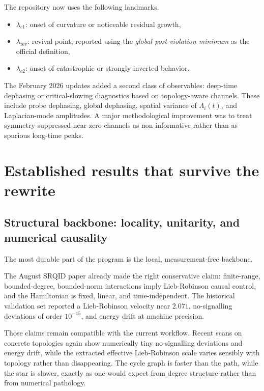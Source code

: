 \documentclass[11pt]{article}
\begin{document}
The repository now uses the following landmarks.

\begin{itemize}
    \item $\lambda_{c1}$: onset of curvature or noticeable residual growth,
    \item $\lambda_{\mathrm{rev}}$: revival point, reported using the \emph{global post-violation minimum} as the official definition,
    \item $\lambda_{c2}$: onset of catastrophic or strongly inverted behavior.
\end{itemize}

The February 2026 updates added a second class of observables: deep-time dephasing or critical-slowing diagnostics based on topology-aware channels. These include probe dephasing, global dephasing, spatial variance of $\Lambda_i(t)$, and Laplacian-mode amplitudes. A major methodological improvement was to treat symmetry-suppressed near-zero channels as non-informative rather than as spurious long-time peaks.

\section{Established results that survive the rewrite}

\subsection{Structural backbone: locality, unitarity, and numerical causality}

The most durable part of the program is the local, measurement-free backbone.

The August SRQID paper already made the right conservative claim: finite-range, bounded-degree, bounded-norm interactions imply Lieb-Robinson causal control, and the Hamiltonian is fixed, linear, and time-independent. The historical validation set reported a Lieb-Robinson velocity near $2.071$, no-signalling deviations of order $10^{-15}$, and energy drift at machine precision.

Those claims remain compatible with the current workflow. Recent scans on concrete topologies again show numerically tiny no-signalling deviations and energy drift, while the extracted effective Lieb-Robinson scale varies sensibly with topology rather than disappearing. The cycle graph is faster than the path, while the star is slower, exactly as one would expect from degree structure rather than from numerical pathology.
\end{document}
